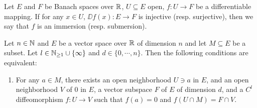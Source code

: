 \begin{definitionenv}
    Let $E$ and $F$ be Banach spaces over $\mathbb{R}$,
    $U \subseteq E$ open, $f : U \longrightarrow F$ be a differentiable mapping.
    If for any $x \in U$, $\DD f(x) : E \longrightarrow F$ is injective (resp. surjective),
    then we say that $f$ is an immersion (resp. submersion).
\end{definitionenv}

\begin{theoremenv}
    Let $n \in \mathbb{N}$ and $E$ be a vector space over $\mathbb{R}$ of dimension $n$ and let $M \subseteq E$ be a subset.
    Let $l \in \mathbb{N}_{\ge 1} \cup \{\infty\}$ and $d \in \{0,\cdots,n\}$.
    Then the following conditions are equivalent:
    \begin{enumerate}[label=(\arabic*)]
        \item For any $a \in M$, there exists an open neighborhood $U \ni a$ in $E$, and an open neighborhood $V$ of $0$ in $E$,
            a vector subspace $F$ of $E$ of dimension $d$, and a $C^l$ diffeomorphism $f : U \longrightarrow V$ such that $f(a) = 0$ and $f(U \cap M) = F \cap V$.
            \begin{figure}[H]
                \centering

\end{figure}
\end{enumerate}
\end{theoremenv}

